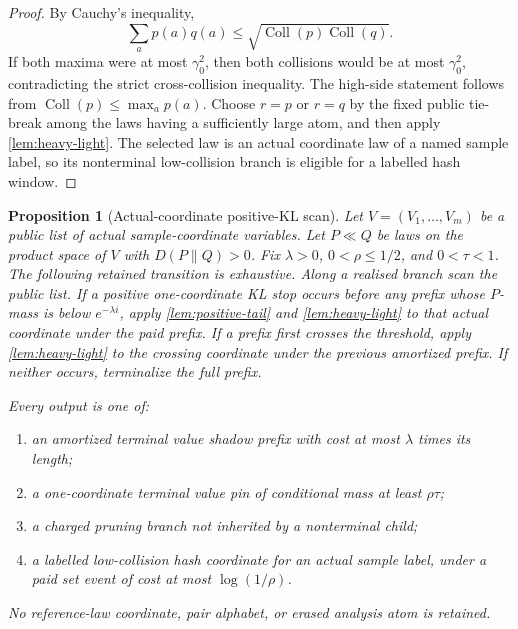 \documentclass[11pt]{article}
\newcommand{\Cref}[1]{\ref{#1}}
\newtheorem{proposition}[theorem]{Proposition}
\theoremstyle{remark}
\newcommand{\Coll}{\operatorname{Coll}}
\begin{document}
\begin{proof}
By Cauchy's inequality,
\[
        \sum_a p(a)q(a)\le \sqrt{\Coll(p)\Coll(q)}.
\]
If both maxima were at most $\gamma_0^2$, then both collisions would be at most $\gamma_0^2$, contradicting the strict cross-collision inequality.  The high-side statement follows from $\Coll(p)\le\max_a p(a)$.  Choose $r=p$ or $r=q$ by the fixed public tie-break among the laws having a sufficiently large atom, and then apply \Cref{lem:heavy-light}.  The selected law is an actual coordinate law of a named sample label, so its nonterminal low-collision branch is eligible for a labelled hash window.
\end{proof}

\begin{proposition}[Actual-coordinate positive-KL scan]\label{prop:positive-kl-scan}
Let $V=(V_1,\ldots,V_m)$ be a public list of actual sample-coordinate variables.  Let $P\ll Q$ be laws on the product space of $V$ with $D(P\|Q)>0$.  Fix $\lambda>0$, $0<\rho\le 1/2$, and $0<\tau<1$.  The following retained transition is exhaustive.  Along a realised branch scan the public list.  If a positive one-coordinate KL stop occurs before any prefix whose $P$-mass is below $e^{-\lambda i}$, apply \Cref{lem:positive-tail} and \Cref{lem:heavy-light} to that actual coordinate under the paid prefix.  If a prefix first crosses the threshold, apply \Cref{lem:heavy-light} to the crossing coordinate under the previous amortized prefix.  If neither occurs, terminalize the full prefix.

Every output is one of:
\begin{enumerate}[label=\textup{(\roman*)}]
\item an amortized terminal value shadow prefix with cost at most $\lambda$ times its length;
\item a one-coordinate terminal value pin of conditional mass at least $\rho\tau$;
\item a charged pruning branch not inherited by a nonterminal child;
\item a labelled low-collision hash coordinate for an actual sample label, under a paid set event of cost at most $\log(1/\rho)$.
\end{enumerate}
No reference-law coordinate, pair alphabet, or erased analysis atom is retained.
\end{proposition}
\end{document}

